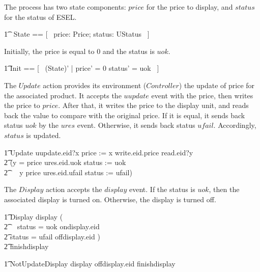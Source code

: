 The process has two state components: $price$ for the price to display, and $status$ for the status of ESEL.
\begin{circusaction}
    	\t1 \circstate\ State == [~ price: Price; status: UStatus ~] \\
\end{circusaction}
Initially, the price is equal to 0 and the status is $uok$.
\begin{zed}
    	\t1	Init == [~ (State)' | price' = 0 \land status' = uok ~] \\
\end{zed}

The $Update$ action provides its environment ($Controller$) the update of price for the associated product. It accepts the $uupdate$ event with the price, then writes the price to $price$. After that, it writes the price to the display unit, and reads back the value to compare with the original price. If it is equal, it sends back status $uok$ by the $ures$ event. Otherwise, it sends back status $ufail$. Accordingly, $status$ is updated.
\begin{circusaction}
        \t1 Update \circdef uupdate.eid?x \then price := x \circseq write.eid.price \then read.eid?y \\
            \t2 \then (\lcircguard y = price \rcircguard \circguard ures.eid.uok \then status := uok \\
            \t2 \,\,\,\,\,\, \extchoice \lcircguard y \neq price \rcircguard \circguard ures.eid.ufail \then status := ufail) \\
\end{circusaction}
The $Display$ action accepts the $display$ event. If the status is $uok$, then the associated display is turned on. Otherwise, the display is turned off.
\begin{circusaction}
        \t1 Display \circdef display \then (\\
            \t2 \,\,\,\, \lcircguard status = uok \rcircguard \circguard ondisplay.eid \then \Skip \\
            \t2 \extchoice \lcircguard status = ufail \rcircguard \circguard offdisplay.eid \then \Skip) \\
            \t2 \circseq finishdisplay \then \Skip
\end{circusaction}
\begin{circusaction}
        \t1 NotUpdateDisplay \circdef display \then offdisplay.eid \then finishdisplay \then \Skip \\
\end{circusaction}
